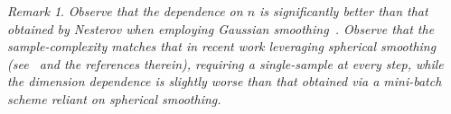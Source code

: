 \documentclass[11pt,reqno]{amsart}
\newcommand{\1}{{\bf 1}}
\newcommand{\2}{{\bf 2}}
\newcommand{\mr}[1]{{\color{blue}#1}}
\newcommand{\pc}[1]{{\color{cyan}#1}}
\newcommand{\us}[1]{\textcolor{red}{#1}}
\newcommand{\bxi}{\boldsymbol{\xi}}
\numberwithin{equation}{section}
\theoremstyle{remark}
\newtheorem{remark}{Remark}[section]
\begin{document}
{				\begin{remark} {\em Observe that the dependence on $n$ is  significantly better than that obtained by Nesterov when employing Gaussian smoothing~\cite{nesterov2017random}.  Observe that the sample-complexity matches that in recent work leveraging spherical smoothing (see~\cite{marrinan2026zeroth} and the references therein), requiring a single-sample at every step, while the dimension dependence is slightly worse than that obtained via a mini-batch scheme reliant on spherical smoothing.  }
				\end{remark} 

				
				
				
}
\end{document}
